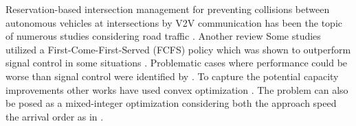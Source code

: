 Reservation-based intersection management for preventing collisions between autonomous vehicles at intersections by V2V communication has been the topic of numerous studies considering road traffic \cite{Chen2016}. Another review \cite{Malikopoulos2018}Some studies utilized a First-Come-First-Served (FCFS) policy which was shown to outperform signal control in some situations \cite{Dresner2008}. Problematic cases where performance could be worse than signal control were identified by \cite{Levin2016}. To capture the potential capacity improvements other works have used convex optimization \cite{Dai2017}.
The problem can also be posed as a mixed-integer optimization considering both the approach speed the arrival order as in \cite{Levin2017}.  
%
%    
